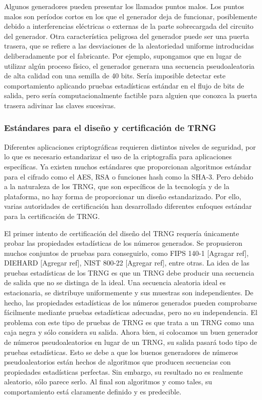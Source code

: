 	            Algunos generadores pueden presentar los llamados puntos malos. Los puntos malos son períodos cortos en los que el generador deja de funcionar, posiblemente debido a interferencias eléctricas o externas de la parte sobrecargada del circuito del generador. Otra característica peligrosa del generador puede ser una puerta trasera, que se refiere a las desviaciones de la aleatoriedad uniforme introducidas deliberadamente por el fabricante. Por ejemplo, supongamos que en lugar de utilizar algún proceso físico, el generador generara una secuencia pseudoaleatoria de alta calidad con una semilla de 40 bits. Sería imposible detectar este comportamiento aplicando pruebas estadísticas estándar en el flujo de bits de salida, pero sería computacionalmente factible para alguien que conozca la puerta trasera adivinar las claves sucesivas.
	
	
		    \subsubsection{Estándares para el diseño y certificación de TRNG}
	
	            Diferentes aplicaciones criptográficas requieren distintos niveles de seguridad, por lo que es necesario estandarizar el uso de la criptografía para aplicaciones específicas. Ya existen muchos estándares que proporcionan algoritmos estándar para el cifrado como el AES, RSA o funciones hash como la SHA-3. Pero debido a la naturaleza de los TRNG, que son específicos de la tecnología y de la plataforma, no hay forma de proporcionar un diseño estandarizado. Por ello, varias autoridades de certificación han desarrollado diferentes enfoques estándar para la certificación de TRNG.
	
	            El primer intento de certificación del diseño del TRNG requería únicamente probar las propiedades estadísticas de los números generados. Se propusieron muchos conjuntos de pruebas para conseguirlo, como FIPS 140-1 [Agragar ref], DIEHARD [Agregar ref], NIST 800-22 [Agregar ref], entre otras. La idea de las pruebas estadísticas de los TRNG es que un TRNG debe producir una secuencia de salida que no se distinga de la ideal. Una secuencia aleatoria ideal es estacionaria, se distribuye uniformemente y sus muestras son independientes. De hecho, las propiedades estadísticas de los números generados pueden comprobarse fácilmente mediante pruebas estadísticas adecuadas, pero no su independencia. El problema con este tipo de pruebas de TRNG es que trata a un TRNG como una caja negra y sólo considera su salida. Ahora bien, si colocamos un buen generador de números pseudoaleatorios en lugar de un TRNG, su salida pasará todo tipo de pruebas estadísticas. Esto se debe a que los buenos generadores de números pseudoaleatorios están hechos de algoritmos que producen secuencias con propiedades estadísticas perfectas. Sin embargo, su resultado no es realmente aleatorio, sólo parece serlo. Al final son algoritmos y como tales, su comportamiento está claramente definido y es predecible.
	
